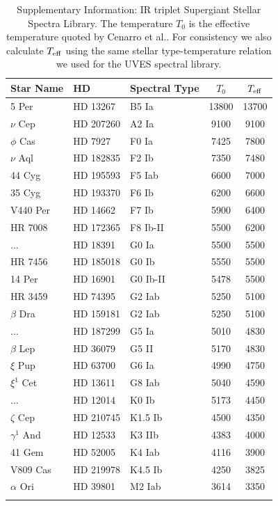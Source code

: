 \begin{table}
\begin{center}
\begin{tabular}{lllcc}
\hline
Star Name & HD & Spectral Type &  $T_0$ &  $T_{\rm eff}$\\
\hline
\hline
5 Per         & HD 13267   &   B5     Ia &	 13800 &	13700\\
$\nu$ Cep     & HD 207260  &   A2     Ia &	  9100 &	 9100\\
$\phi$ Cas    & HD 7927    &   F0     Ia &	  7425 &	 7800\\
$\nu$ Aql     & HD 182835  &   F2     Ib &	  7350 &	 7480\\
44 Cyg        & HD 195593  &   F5    Iab &	  6600 &	 7000\\
35 Cyg        & HD 193370  &   F6     Ib &	  6200 &	 6600\\
V440 Per      & HD 14662   &   F7     Ib &	  5900 &	 6400\\
HR 7008       & HD 172365  &   F8  Ib-II &	  5500 &         6200\\
$\dots$       & HD 18391   &   G0     Ia &	  5500 &	 5500\\
HR 7456       & HD 185018  &   G0     Ib &	  5550 &	 5500\\
14 Per        & HD 16901   &   G0  Ib-II &	  5478 &	 5500\\
HR 3459       & HD 74395   &   G2    Iab &	  5250 &	 5100\\
$\beta$ Dra   & HD 159181  &   G2    Iab &	  5250 &	 5100\\
$\dots$       & HD 187299  &   G5     Ia &	  5010 &	 4830\\
$\beta$ Lep   & HD 36079   &   G5     II &	  5170 &	 4830\\
$\xi$ Pup     & HD 63700   &   G6     Ia &	  4990 &	 4750\\
$\xi^1$ Cet   & HD 13611   &   G8    Iab &	  5040 &	 4590\\
$\dots$       & HD 12014   &   K0     Ib &	  5173 &	 4450\\
$\zeta$ Cep   & HD 210745  & K1.5     Ib &	  4500 &	 4350\\
$\gamma^1$ And& HD 12533   &   K3    IIb &	  4383 &	 4000\\
41 Gem        & HD 52005   &   K4    Iab &	  4116 &	 3900\\
V809 Cas      & HD 219978  & K4.5     Ib &	  4250 &	 3825\\
$\alpha$ Ori  & HD 39801   &   M2    Iab &	  3614 &	 3350\\
\hline\label{tab:CaIIstellarlib}
\end{tabular}
\caption{Supplementary Information:  
IR triplet Supergiant Stellar Spectra
Library\cite{Cenarro01}.  The temperature $T_0$ is the effective
temperature quoted by Cenarro et al.\cite{Cenarro01}.  For consistency
we also calculate $T_{\rm eff}$ using the same stellar type-temperature
relation\cite{Humphreys84} we used for the UVES spectral library.
}
\end{center}
\end{table}


